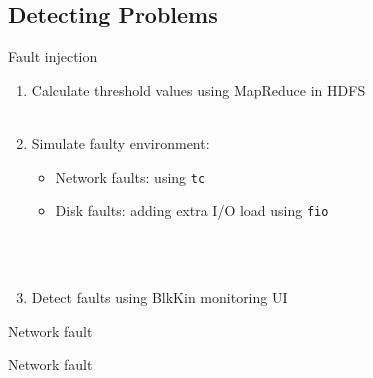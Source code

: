 \subsection{Detecting Problems}

\begin{frame}{Fault injection}
\begin{enumerate}
\item Calculate threshold values using MapReduce in HDFS
\hfill \\
\hfill \\
\item Simulate faulty environment:
    \begin{itemize}
    \item Network faults: using \texttt{tc}
    \item Disk faults: adding extra I/O load using \texttt{fio}
    \end{itemize}
\hfill \\
\hfill \\
\item Detect faults using BlkKin monitoring UI
\end{enumerate}
\end{frame}

\begin{frame}{Network fault}
\end{frame}

\begin{frame}{Network fault}
\begin{center}
\end{center}
\end{frame}


